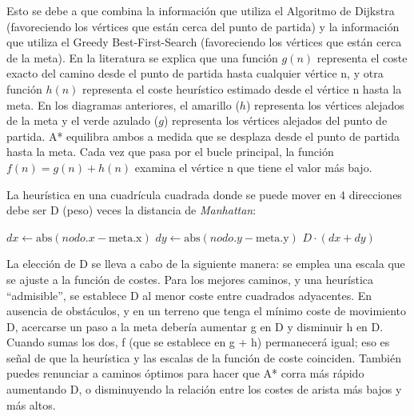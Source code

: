 \documentclass[reprint,amsmath,amssymb,aps]{revtex4-2}
\begin{document}
Esto se debe a que combina la información que utiliza el Algoritmo de Dijkstra (favoreciendo los vértices que están cerca del punto de partida) y la información que utiliza el Greedy Best-First-Search (favoreciendo los vértices que están cerca de la meta). En la literatura se explica que una función $g(n)$ representa el coste exacto del camino desde el punto de partida hasta cualquier vértice n, y otra función $h(n)$ representa el coste heurístico estimado desde el vértice n hasta la meta. En los diagramas anteriores, el amarillo ($h$) representa los vértices alejados de la meta y el verde azulado ($g$) representa los vértices alejados del punto de partida. A* equilibra ambos a medida que se desplaza desde el punto de partida hasta la meta. Cada vez que pasa por el bucle principal, la función $f(n)=g(n)+h(n)$ examina el vértice n que tiene el valor más bajo.

La heurística en una cuadrícula cuadrada donde se puede mover en 4 direcciones debe ser D (peso) veces la distancia de \textit{Manhattan}:

\begin{algorithmic}
        \State $dx \gets \text{abs}(nodo.x - \text{meta.x})$
        \State $dy \gets \text{abs}(nodo.y - \text{meta.y})$
        \State \Return $D \cdot (dx + dy)$
    \EndFunction
\end{algorithmic}


La elección de D se lleva a cabo de la siguiente manera: se emplea una escala que se ajuste a la función de costes. Para los mejores caminos, y una heurística ``admisible'', se establece D al menor coste entre cuadrados adyacentes. En ausencia de obstáculos, y en un terreno que tenga el mínimo coste de movimiento D, acercarse un paso a la meta debería aumentar g en D y disminuir h en D. Cuando sumas los dos, f (que se establece en g + h) permanecerá igual; eso es señal de que la heurística y las escalas de la función de coste coinciden. También puedes renunciar a caminos óptimos para hacer que A* corra más rápido aumentando D, o disminuyendo la relación entre los costes de arista más bajos y más altos.
\end{document}
